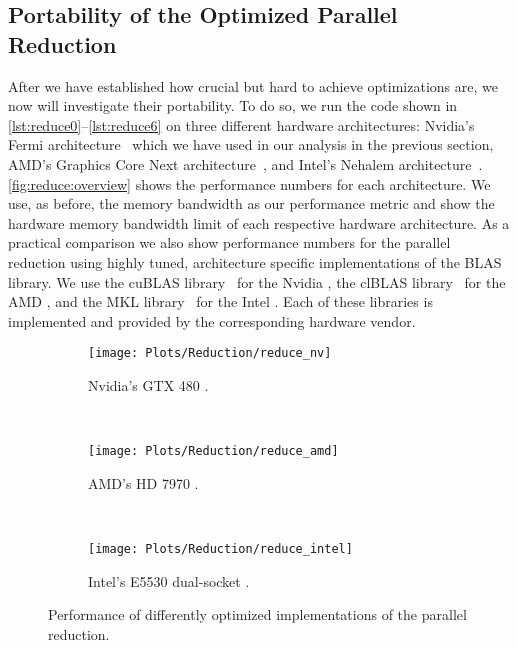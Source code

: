 \subsection{Portability of the Optimized Parallel Reduction}
After we have established how crucial but hard to achieve optimizations are, we now will investigate their portability.
To do so, we run the code shown in \autoref{lst:reduce0}--\ref{lst:reduce6} on three different hardware architectures:
Nvidia's Fermi \GPU architecture~\cite{CUDAFermi2009} which we have used in our analysis in the previous section, AMD's Graphics Core Next \GPU architecture~\cite{AMDGCN2012}, and Intel's Nehalem \CPU architecture~\cite{IntelNehalem2008}.
\autoref{fig:reduce:overview} shows the performance numbers for each architecture.
We use, as before, the memory bandwidth as our performance metric and show the hardware memory bandwidth limit of each respective hardware architecture.
As a practical comparison we also show performance numbers for the parallel reduction using highly tuned, architecture specific implementations of the BLAS library.
We use the cuBLAS library~\cite{cuBLAS} for the Nvidia \GPU, the clBLAS library~\cite{clBLAS} for the AMD \GPU, and the MKL library~\cite{MKL} for the Intel \CPU.
Each of these libraries is implemented and provided by the corresponding hardware vendor.

\begin{figure}[p]
  \centering
\begin{subfigure}{\linewidth}
  \texttt{[image: Plots/Reduction/reduce\_nv]}
  \caption{Nvidia's GTX 480 \GPU.}
  \label{fig:reduce:nvidia}
\end{subfigure}\\
\begin{subfigure}{\linewidth}
  \texttt{[image: Plots/Reduction/reduce\_amd]}
  \caption{AMD's HD 7970 \GPU.}
  \label{fig:reduce:amd}
\end{subfigure}\\
\begin{subfigure}{\linewidth}
  \texttt{[image: Plots/Reduction/reduce\_intel]}
    \caption{Intel's E5530 dual-socket \CPU.}
  \label{fig:reduce:intel}
\end{subfigure}
  \caption{Performance of differently optimized implementations of the parallel reduction.}
  \label{fig:reduce:overview}
\end{figure}



